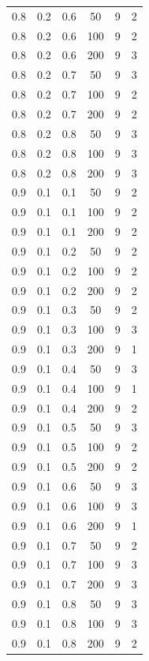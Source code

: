 \documentclass[a4paper,14pt, unknownkeysallowed]{extreport}
\begin{document}
\begin{center}
\begin{longtable}[c]{|c|c|c|c|c|c|}
        \hline
         0.8 &  0.2 &  0.6 &   50 &     9 &     2 \\
         0.8 &  0.2 &  0.6 &  100 &     9 &     2 \\
         0.8 &  0.2 &  0.6 &  200 &     9 &     3 \\
        \hline
         0.8 &  0.2 &  0.7 &   50 &     9 &     3 \\
         0.8 &  0.2 &  0.7 &  100 &     9 &     2 \\
         0.8 &  0.2 &  0.7 &  200 &     9 &     2 \\
        \hline
         0.8 &  0.2 &  0.8 &   50 &     9 &     3 \\
         0.8 &  0.2 &  0.8 &  100 &     9 &     3 \\
         0.8 &  0.2 &  0.8 &  200 &     9 &     3 \\
        \hline
         0.9 &  0.1 &  0.1 &   50 &     9 &     2 \\
         0.9 &  0.1 &  0.1 &  100 &     9 &     2 \\
         0.9 &  0.1 &  0.1 &  200 &     9 &     2 \\
        \hline
         0.9 &  0.1 &  0.2 &   50 &     9 &     2 \\
         0.9 &  0.1 &  0.2 &  100 &     9 &     2 \\
         0.9 &  0.1 &  0.2 &  200 &     9 &     2 \\
        \hline
         0.9 &  0.1 &  0.3 &   50 &     9 &     2 \\
         0.9 &  0.1 &  0.3 &  100 &     9 &     3 \\
         0.9 &  0.1 &  0.3 &  200 &     9 &     1 \\
        \hline
         0.9 &  0.1 &  0.4 &   50 &     9 &     3 \\
         0.9 &  0.1 &  0.4 &  100 &     9 &     1 \\
         0.9 &  0.1 &  0.4 &  200 &     9 &     2 \\
        \hline
         0.9 &  0.1 &  0.5 &   50 &     9 &     3 \\
         0.9 &  0.1 &  0.5 &  100 &     9 &     2 \\
         0.9 &  0.1 &  0.5 &  200 &     9 &     2 \\
        \hline
         0.9 &  0.1 &  0.6 &   50 &     9 &     3 \\
         0.9 &  0.1 &  0.6 &  100 &     9 &     3 \\
         0.9 &  0.1 &  0.6 &  200 &     9 &     1 \\
        \hline
         0.9 &  0.1 &  0.7 &   50 &     9 &     2 \\
         0.9 &  0.1 &  0.7 &  100 &     9 &     3 \\
         0.9 &  0.1 &  0.7 &  200 &     9 &     3 \\
        \hline
         0.9 &  0.1 &  0.8 &   50 &     9 &     3 \\
         0.9 &  0.1 &  0.8 &  100 &     9 &     3 \\
         0.9 &  0.1 &  0.8 &  200 &     9 &     2 \\
        \hline
    

\end{longtable}
\end{center}
\end{document}
